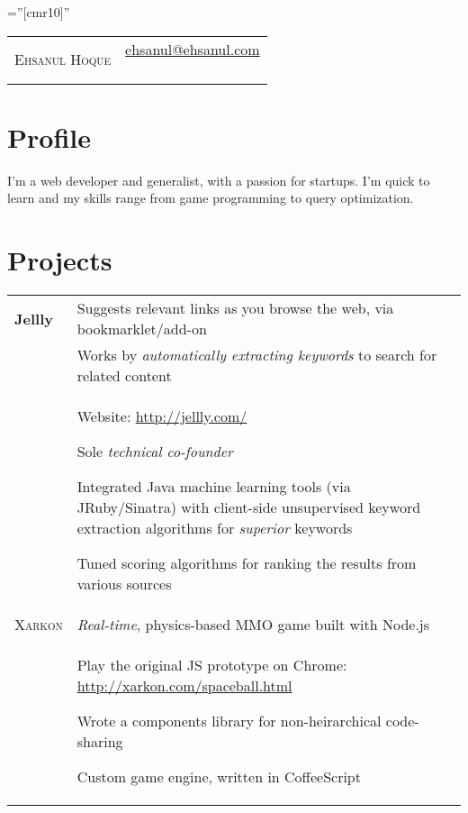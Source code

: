 \documentclass[a4paper,10pt]{article}
\newenvironment{packed-list}{
  \vspace{2pt}
  \begin{itemize}[itemsep=1pt,partopsep=0pt,leftmargin=1.5em]
    \setlength{\parskip}{0pt}
    \setlength{\partopsep}{9pt}
    \setlength{\parsep}{0pt}
    \setlength{\topsep}{0pt}
} {\end{itemize}}
\begin{document}
\pagestyle{empty} %

\font\fb=''[cmr10]'' %

\begin{tabular*}{\textwidth}{@{\extracolsep{\fill}} lr}
      {\color{Gray!50!black}\Huge \textsc{Ehsanul Hoque}}
      & \pbox{20cm}{
          {\large \href{mailto:ehsanul@ehsanul.com}{ehsanul@ehsanul.com}}\\
          \hspace*{\fill}{\large (347) 679 9621}\\
        }\\
\end{tabular*}

\section{Profile}
{\fontsize{12}{14}\selectfont  
  I'm a web developer and generalist, with a passion for startups.
  I'm quick to learn and my skills range from game programming
  to query optimization.  }


\section{Projects}
\begin{tabular}{p{}p{}}
  \hfill \textbf{Jellly}
    & Suggests relevant links as you browse the web, via bookmarklet/add-on\\
    &  Works by \emph{automatically extracting keywords} to search for related content\\
    & Website: \href{http://jellly.com/}{http://jellly.com/} 
    \begin{packed-list}
      \item{ Sole \emph{technical co-founder} }
      \item{ Integrated Java machine learning tools (via JRuby/Sinatra) with client-side unsupervised keyword extraction algorithms for \emph{superior} keywords}
      \item{ Tuned scoring algorithms for ranking the results from various sources }
    \end{packed-list}
    \vspace{-5pt}
    \\
  \hfill \textsc{Xarkon}
    & \emph{Real-time}, physics-based MMO game built with Node.js\\
    & Play the original JS prototype on Chrome:
           \href{http://xarkon.com/spaceball.html}{http://xarkon.com/spaceball.html}
    \begin{packed-list}
      \item{ Wrote a components library for non-heirarchical code-sharing }
      \item{ Custom game engine, written in CoffeeScript }
    \end{packed-list}
    \\
\end{tabular}
\vspace{-25pt}
\end{document}
